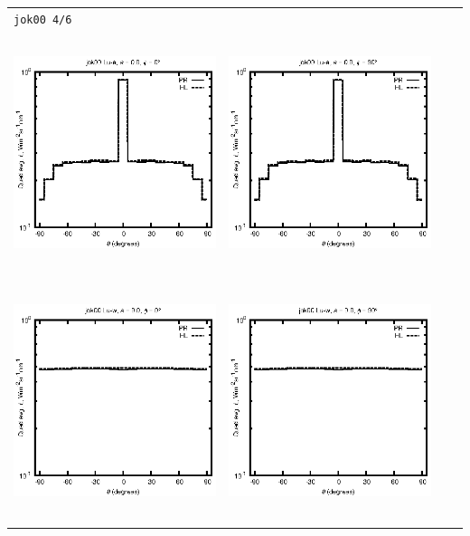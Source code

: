 \begin{tabular}{c c c c}
\multicolumn{4}{l}{\texttt{jok00 4/6}} \\
\includegraphics[height=7cm]{../eps/jok00_Lu_a_fwd.eps} &
\includegraphics[height=7cm]{../eps/jok00_Lu_a_cross.eps}\\
\includegraphics[height=7cm]{../eps/jok00_Lu_w_fwd.eps} &
\includegraphics[height=7cm]{../eps/jok00_Lu_w_cross.eps} \\

\end{tabular}
